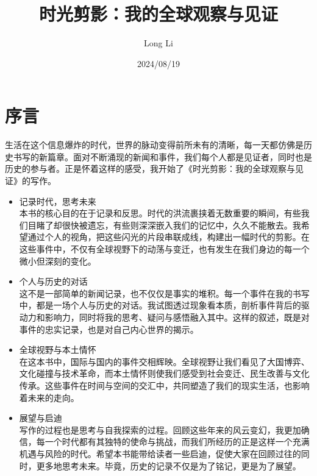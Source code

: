 \documentclass[lang=cn,newtx,10pt,scheme=chinese]{elegantbook}
\title{时光剪影：我的全球观察与见证}
\author{Long Li}
\date{2024/08/19}
\begin{document}
\maketitle
\frontmatter

\tableofcontents

\mainmatter

\chapter{序言}

生活在这个信息爆炸的时代，世界的脉动变得前所未有的清晰，每一天都仿佛是历史书写的新篇章。面对不断涌现的新闻和事件，我们每个人都是见证者，同时也是历史的参与者。正是怀着这样的感受，我开始了《时光剪影：我的全球观察与见证》的写作。

\begin{itemize}
\item 记录时代，思考未来 \\
本书的核心目的在于记录和反思。时代的洪流裹挟着无数重要的瞬间，有些我们目睹了却很快被遗忘，有些则深深嵌入我们的记忆中，久久不能散去。我希望通过个人的视角，把这些闪光的片段串联成线，构建出一幅时代的剪影。在这些事件中，不仅有全球视野下的动荡与变迁，也有发生在我们身边的每一个微小但深刻的变化。

\item 个人与历史的对话 \\
这不是一部简单的新闻记录，也不仅仅是事实的堆积。每一个事件在我的书写中，都是一场个人与历史的对话。我试图透过现象看本质，剖析事件背后的驱动力和影响力，同时将我的思考、疑问与感悟融入其中。这样的叙述，既是对事件的忠实记录，也是对自己内心世界的揭示。

\item 全球视野与本土情怀 \\
在这本书中，国际与国内的事件交相辉映。全球视野让我们看见了大国博弈、文化碰撞与技术革命，而本土情怀则使我们感受到社会变迁、民生改善与文化传承。这些事件在时间与空间的交汇中，共同塑造了我们的现实生活，也影响着未来的走向。

\item 展望与启迪 \\
写作的过程也是思考与自我探索的过程。回顾这些年来的风云变幻，我更加确信，每一个时代都有其独特的使命与挑战，而我们所经历的正是这样一个充满机遇与风险的时代。希望本书能带给读者一些启迪，促使大家在回顾过往的同时，更多地思考未来。毕竟，历史的记录不仅是为了铭记，更是为了展望。
\end{itemize}



\end{document}
